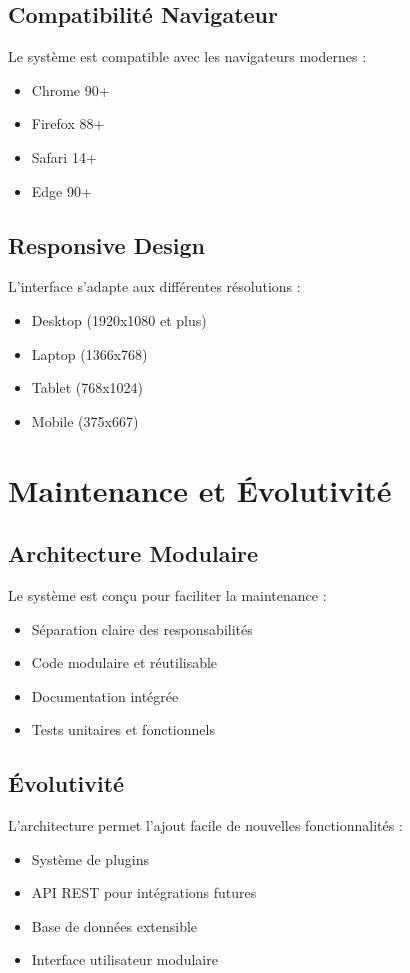 \documentclass[12pt,a4paper]{article}
\begin{document}
\subsection{Compatibilité Navigateur}
Le système est compatible avec les navigateurs modernes :
\begin{itemize}
    \item Chrome 90+
    \item Firefox 88+
    \item Safari 14+
    \item Edge 90+
\end{itemize}

\subsection{Responsive Design}
L'interface s'adapte aux différentes résolutions :
\begin{itemize}
    \item Desktop (1920x1080 et plus)
    \item Laptop (1366x768)
    \item Tablet (768x1024)
    \item Mobile (375x667)
\end{itemize}

\section{Maintenance et Évolutivité}

\subsection{Architecture Modulaire}
Le système est conçu pour faciliter la maintenance :
\begin{itemize}
    \item Séparation claire des responsabilités
    \item Code modulaire et réutilisable
    \item Documentation intégrée
    \item Tests unitaires et fonctionnels
\end{itemize}

\subsection{Évolutivité}
L'architecture permet l'ajout facile de nouvelles fonctionnalités :
\begin{itemize}
    \item Système de plugins
    \item API REST pour intégrations futures
    \item Base de données extensible
    \item Interface utilisateur modulaire
\end{itemize}
\end{document}
